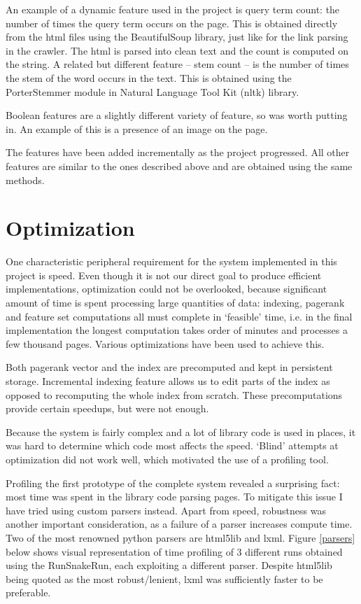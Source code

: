 \documentclass[12pt,twoside,notitlepage]{report}
\begin{document}
An example of a dynamic feature used in the project is query term count: the
number of times the query term occurs on the page. This is obtained directly
from the html files using the BeautifulSoup library, just like for the link
parsing in the crawler. The html is parsed into clean text and the count is
computed on the string.
A related but different feature -- stem count -- is the number of times the
stem of the word occurs in the text. This is obtained using the PorterStemmer
module in Natural Language Tool Kit (nltk) library.

Boolean features are a slightly different variety of feature, so was worth
putting in. An example of this is a presence of an image on the page.

The features have been added incrementally as the project progressed. All other
features are similar to the ones described above and are obtained using the
same methods.


\section{Optimization}

One characteristic peripheral requirement for the system implemented in this
project is speed.  Even though it is not our direct goal to produce efficient
implementations, optimization could not be overlooked, because significant amount of
time is spent processing large quantities of data: indexing, pagerank
and feature set computations all must complete in `feasible' time, i.e. in the
final implementation the longest computation takes order of minutes and
processes a few thousand pages. Various optimizations have been used to achieve
this.

Both pagerank vector and the index are precomputed and kept in persistent
storage. Incremental indexing feature allows us to edit parts of the index as
opposed to recomputing the whole index from scratch. These precomputations
provide certain speedups, but were not enough.

Because the system is fairly complex and a lot of library code is used in
places, it was hard to determine which code most affects the speed. `Blind'
attempts at optimization did not work well, which motivated the use of a
profiling tool.

Profiling the first prototype of the complete system revealed a surprising
fact: most time was spent in the library code parsing pages. To mitigate this
issue I have tried using custom parsers instead. Apart from speed, robustness
was another important consideration, as a failure of a parser increases compute
time. Two of the most renowned python parsers are html5lib and lxml. 
Figure \ref{parsers} below shows visual representation of time profiling
of 3 different runs obtained using the RunSnakeRun, each exploiting a
different parser. 
Despite html5lib being quoted as the most robust/lenient, lxml was sufficiently
faster to be preferable.
\end{document}
